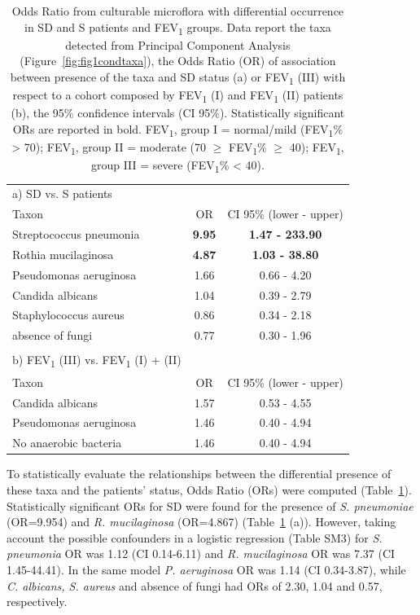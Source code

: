 \begin{table}
\centering
\scriptsize
\begin{tabular}{l c c}
\hline
a) SD vs. S patients &  & \\		
Taxon & OR & CI 95\% (lower - upper) \\
\hline\hline
Streptococcus pneumonia & \textbf{9.95} & \textbf{1.47 - 233.90} \\
Rothia mucilaginosa & \textbf{4.87} & \textbf{1.03 - 38.80} \\
Pseudomonas aeruginosa & 1.66 & 0.66 - 4.20 \\
Candida albicans & 1.04 & 0.39 - 2.79 \\
Staphylococcus aureus & 0.86 & 0.34 - 2.18 \\
absence of fungi & 0.77 & 0.30 - 1.96 \\
  &  &  \\
b) FEV\textsubscript{1} (III) vs. FEV\textsubscript{1} (I) + (II) &  & \\
Taxon & OR & CI 95\% (lower - upper) \\
\hline\hline
Candida albicans & 1.57 & 0.53 - 4.55 \\
Pseudomonas aeruginosa & 1.46 & 0.40 - 4.94 \\
No anaerobic bacteria & 1.46 & 0.40 - 4.94 \\
\hline
\end{tabular}
\caption{\label{tab:ortrflp}Odds Ratio from culturable microflora with differential occurrence in SD and S patients and FEV\textsubscript{1} groups. Data report the taxa detected from Principal Component Analysis (Figure~\ref{fig:fig1condtaxa}), the Odds Ratio (OR) of association between presence of the taxa and SD status (a) or FEV\textsubscript{1} (III) with respect to a cohort composed by FEV\textsubscript{1} (I) and FEV\textsubscript{1} (II) patients (b), the 95\% confidence intervals (CI 95\%). Statistically significant ORs are reported in bold. FEV\textsubscript{1}, group I = normal/mild (FEV\textsubscript{1}\% {\textgreater} 70); FEV\textsubscript{1}, group II = moderate (70 ${ \geq}$ FEV\textsubscript{1}\% ${\geq}$ 40); FEV\textsubscript{1}, group III = severe (FEV\textsubscript{1}\% {\textless} 40).}
\end{table}
To statistically evaluate the relationships between the differential presence of these taxa and the patients' status, Odds Ratio (ORs) were computed (Table~\ref{tab:ortrflp}). Statistically significant ORs for SD were found for the presence of \textit{S. pneumoniae} (OR=9.954) and \textit{R. mucilaginosa} (OR=4.867) (Table~\ref{tab:ortrflp} (a)). However, taking account the possible confounders in a logistic regression (Table SM3) for \textit{S. pneumonia }OR was 1.12 (CI 0.14-6.11) and \textit{R. mucilaginosa} OR was 7.37 (CI 1.45-44.41). In the same model \textit{P. aeruginosa} OR was 1.14 (CI 0.34-3.87), while \textit{C. albicans, S. aureus }and absence of fungi had ORs of 2.30, 1.04 and 0.57, respectively.\\
